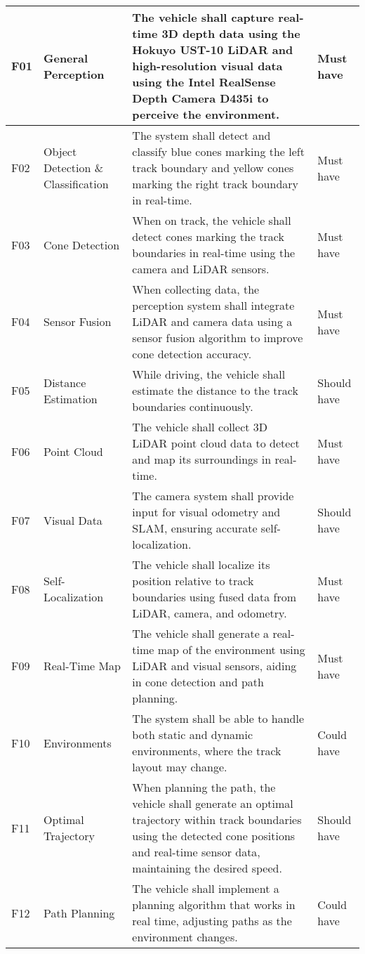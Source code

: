 \begin{center}
\begin{longtable}{ | m{2em} | m{10em} | m{16em} | m{8em} | }
		F01 & General Perception & The vehicle shall capture real-time 3D depth data using the Hokuyo UST-10 LiDAR and high-resolution visual data using the Intel RealSense Depth Camera D435i to perceive the environment. & Must have\\
		\hline
		F02 & Object Detection \& Classification & The system shall detect and classify blue cones marking the left track boundary and yellow cones marking the right track boundary in real-time. & Must have\\
		\hline
		F03 & Cone Detection & When on track, the vehicle shall detect cones marking the track boundaries in real-time using the camera and LiDAR sensors. & Must have\\
		\hline
		F04 & Sensor Fusion & When collecting data, the perception system shall integrate LiDAR and camera data using a sensor fusion algorithm to improve cone detection accuracy. & Must have\\
		\hline
		F05 & Distance Estimation & While driving, the vehicle shall estimate the distance to the track boundaries continuously. & Should have\\
		\hline
		F06 & Point Cloud & The vehicle shall collect 3D LiDAR point cloud data to detect and map its surroundings in real-time. & Must have\\
		\hline
		F07 & Visual Data & The camera system shall provide input for visual odometry and SLAM, ensuring accurate self-localization. & Should have\\
		\hline
		F08 & Self-Localization & The vehicle shall localize its position relative to track boundaries using fused data from LiDAR, camera, and odometry. & Must have\\
		\hline
		F09 & Real-Time Map & The vehicle shall generate a real-time map of the environment using LiDAR and visual sensors, aiding in cone detection and path planning. & Must have\\
		\hline
		F10 & Environments & The system shall be able to handle both static and dynamic environments, where the track layout may change. & Could have\\
		\hline
		F11 & Optimal Trajectory & When planning the path, the vehicle shall generate an optimal trajectory within track boundaries using the detected cone positions and real-time sensor data, maintaining the desired speed. & Should have\\
		\hline
		F12 & Path Planning & The vehicle shall implement a planning algorithm that works in real time, adjusting paths as the environment changes. & Could have\\

\end{longtable}
\end{center}
